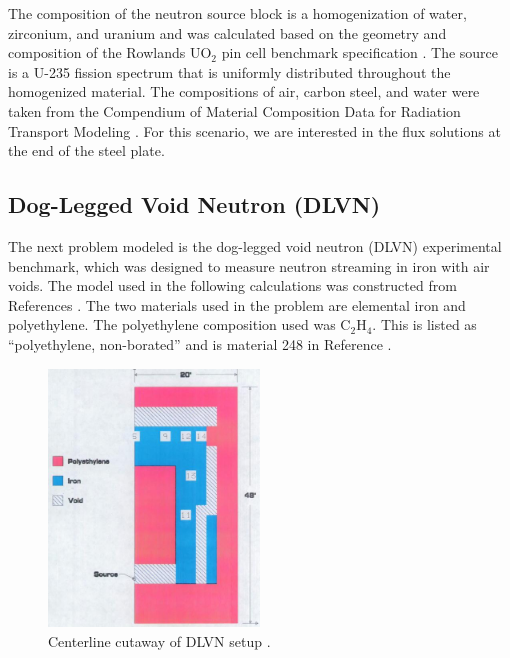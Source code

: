 \documentclass{article} %
\begin{document}
The composition of the neutron source block is a homogenization of water,
zirconium, and uranium and was calculated based on the geometry and
composition of the Rowlands UO$_2$ pin cell benchmark specification
\cite{pincell}. The source is a U-235 fission  spectrum that is uniformly
distributed throughout the homogenized material. The compositions of air,
carbon steel, and water were taken from the Compendium of  Material
Composition Data for Radiation Transport Modeling \cite{pnnl}. For this
scenario, we are interested in the flux solutions at the end of the steel
plate.

\subsection{Dog-Legged Void Neutron (DLVN)}

The next problem modeled is the dog-legged void neutron (DLVN) experimental 
benchmark, which was designed to measure neutron streaming in iron with air
voids. The model used in the following calculations was constructed from
References \cite{sw-dlvn,j-dlvn,dlvn1991}. The two materials used in the
problem are elemental iron and polyethylene. The polyethylene composition used
was C$_2$H$_4$. This is listed as ``polyethylene, non-borated'' and is material
248 in Reference \cite{pnnl}. 

\begin{figure}[!htb]
\centering
\includegraphics[width=0.5\textwidth]{dlvn.png}
\caption{Centerline cutaway of DLVN setup \cite{sw-dlvn}.}
\label{dlvn}
\end{figure}
\end{document}
